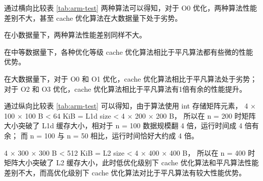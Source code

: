\documentclass[a4paper]{article}
\begin{document}
通过横向比较表 \ref{tab:arm-test} 两种算法可以得知，对于 O0 优化，两种算法性能差别不大，甚至 cache 优化算法在大数据量下处于劣势。

在小数据量下，两种算法性能差别同样不大。

在中等数据量下，各种优化等级 cache 优化算法相比于平凡算法都有些微的性能优势。

在大数据量下，对于 O0 和 O1 优化，cache 优化算法相比于平凡算法处于劣势；
对于 O2 和 O3 优化，cache 优化算法相比于平凡算法有1倍有余的性能提升。

通过纵向比较表 \ref{tab:arm-test} 可以得知，由于算法使用 int 存储矩阵元素，
4 × 100 × 100 B < 64 KiB = L1d size < 4 × 200 × 200 B，
所以在 n = 200 时矩阵大小突破了 L1d 缓存大小，相对于 n = 100 数据规模翻 4 倍，运行时间成 4 倍有余；
而 n = 100 与 n = 50 相比，运行时间恰好大约成 4 倍。

4 × 300 × 300 B < 512 KiB = L2 size < 4 × 400 × 400 B，
所以在 n = 400 时矩阵大小突破了 L2 缓存大小，此时低优化级别下 cache 优化算法和平凡算法性能差别不大，而高优化级别下 cache 优化算法对比于平凡算法有较大性能优势。
\end{document}
